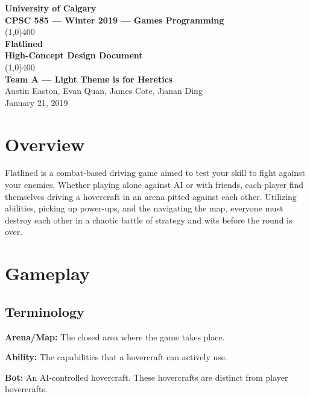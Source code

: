 \documentclass{article}
\newcommand{\name}{Flatlined}
\newcommand{\team}{Team A --- Light Theme is for Heretics}
\theoremstyle{definition}
\begin{document}
\begin{titlepage}
  \begin{center}
    \vspace*{1cm}
    \Large{\textbf{University of Calgary}}\\
    \Large{\textbf{CPSC 585 --- Winter 2019 --- Games Programming}}\\
    \vfill
    \line(1,0){400}\\[1mm]
    \huge{\textbf{\name{}}}\\
    \large{\textbf{High-Concept Design Document}}\\
    \line(1,0){400}\\
    \vfill
    \Large{\textbf{\team{}}}\\
    \Large{Austin Easton, Evan Quan, James Cote, Jianan Ding}\\
    \large{January 21, 2019}
  \end{center}
\end{titlepage}
\setcounter{page}{0}
\tableofcontents
{}
\break{}

\section{Overview}

\name{} is a combat-based driving game aimed to test your skill to fight
against your enemies. Whether playing alone against AI or with friends, each
player find themselves driving a hovercraft in an arena pitted against each
other. Utilizing abilities, picking up power-ups, and the navigating the map,
everyone must destroy each other in a chaotic battle of strategy and wits
before the round is over.

\section{Gameplay}

\subsection{Terminology}

\textbf{Arena/Map:} The closed area where the game takes place.

\textbf{Ability:} The capabilities that a hovercraft can actively use.

\textbf{Bot:} An AI-controlled hovercraft. These hovercrafts are distinct from
player hovercrafts.
\end{document}

